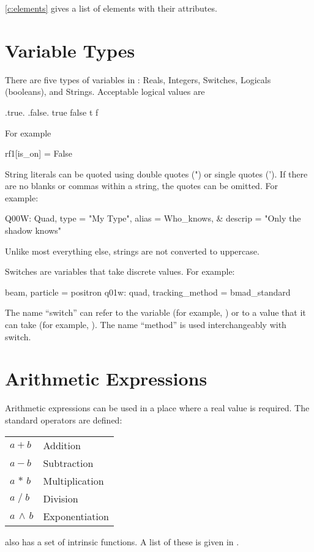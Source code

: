 \cref{c:elements} gives a list of elements with their attributes.

\section{Variable Types}
\label{s:var_types}

There are five types of variables in \bmad: Reals, Integers, Switches,
Logicals (booleans), and Strings. Acceptable logical values are
\begin{example}
  .true.  .false.
   true    false
   t       f
\end{example}
For example
\begin{example}
  rf1[is_on] = False
\end{example}

String literals can be quoted using double quotes (") or single quotes ('). 
If there are no
blanks or commas within a string, the quotes can be omitted. For example:
\begin{example}
  Q00W: Quad, type = "My Type", alias = Who_knows, &
                                  descrip = "Only the shadow knows"
\end{example}
Unlike most everything else, strings are not converted to uppercase.

Switches are variables that take discrete values. For example:
\begin{example}
  beam, particle = positron          
  q01w: quad, tracking\_method = bmad\_standard 
\end{example}
The name ``switch'' can refer to the variable (for example,
) or to a value that it can take (for example,
). The name ``method'' is used interchangeably with switch.

\section{Arithmetic Expressions}

Arithmetic expressions can be used in a place where a real value is required.
The standard operators are defined: \hfil\break
\hspace*{0.15in}
\begin{tabular}{ll}
  $a + b$           & Addition        \\
  $a - b$           & Subtraction     \\
  $a \, \ast \, b$  & Multiplication  \\
  $a \; / \; b$     & Division        \\
  $a \, \land \, b$ & Exponentiation  \\
\end{tabular}
\bmad also has a set of intrinsic functions. A list of these is given
in .

